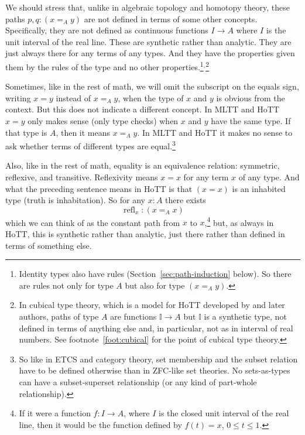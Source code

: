 \documentclass[11pt]{article}
\DeclareMathOperator{\refl}{refl}
\newcommand{\interval}{\mathbb{I}}
\begin{document}
We should stress that, unlike in algebraic topology and homotopy theory,
these paths $p, q : (x =_A y)$ are not defined in terms of some other concepts.
Specifically, they are not defined as continuous functions $I \to A$
where $I$ is the
unit interval of the real line.  These are synthetic rather than analytic.
They are just always there for any terms of any types.
And they have the properties
given them by the rules of the type and no other properties.\footnote{Identity
types also have rules (Section~\ref{sec:path-induction} below).  So there
are rules not only for type $A$ but also for type $(x =_A y)$.}$^,$\footnote{In
cubical type theory, which is a model for HoTT developed by
\citet{bezem-coquand-huber} and later authors, paths of type $A$ are functions
$\interval \to A$ but $\interval$ is a synthetic type, not defined in terms
of anything else and, in particular, not as in interval of real numbers.
See footnote~\ref{foot:cubical} for the point of cubical type theory.}

Sometimes, like in the rest of math, we will omit the subscript on the
equals sign, writing $x = y$ instead of $x =_A y$, when the type
of $x$ and $y$ is obvious from the context.  But this does not indicate
a different concept.  In MLTT and HoTT $x = y$ only makes sense
(only type checks) when $x$ and $y$
have the same type.  If that type is $A$, then it means $x =_A y$.
In MLTT and HoTT it makes no sense to ask whether terms of different types are
equal.\footnote{So like in ETCS and category theory, set membership
and the subset relation have to be defined otherwise than in ZFC-like
set theories.  No sets-as-types can have a subset-superset relationship
(or any kind of part-whole relationship).}

Also, like in the rest of math, equality is an equivalence relation:
symmetric, reflexive, and transitive.  Reflexivity means $x = x$ for
any term $x$ of any type.  And what the preceding sentence means in HoTT
is that $(x = x)$ is an inhabited type (truth is inhabitation).  So for
any $x : A$ there exists
$$
   \refl_x : (x =_A x)
$$
which we can think of as the constant path from $x$ to $x$,\footnote{If
it were a function $f : I \to A$, where $I$ is the closed unit interval
of the real line, then it would be the function defined by $f(t) = x$,
$0 \le t \le 1$.} but, as always in HoTT, this is synthetic rather than
analytic, just there rather than defined in terms of something else.
\end{document}

